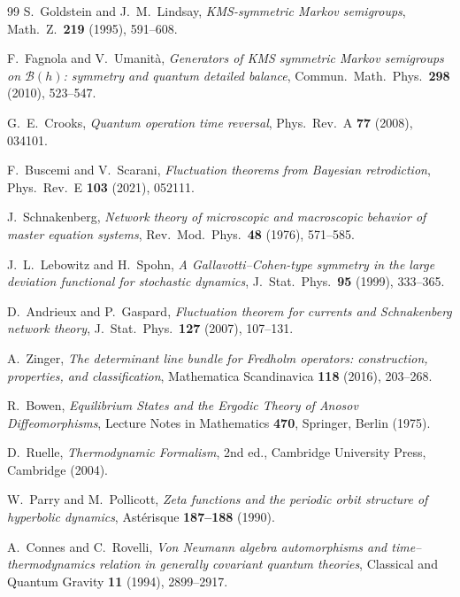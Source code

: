 \documentclass[11pt]{article}
\theoremstyle{definition}
\theoremstyle{remark}
\begin{document}
\begin{thebibliography}{99}
S.~Goldstein and J.~M.~Lindsay,
\emph{KMS-symmetric Markov semigroups},
Math.\ Z.\ \textbf{219} (1995), 591--608.

F.~Fagnola and V.~Umanit\`a,
\emph{Generators of KMS symmetric Markov semigroups on $\mathcal B(h)$:
symmetry and quantum detailed balance},
Commun.\ Math.\ Phys.\ \textbf{298} (2010), 523--547.

G.~E.~Crooks,
\emph{Quantum operation time reversal},
Phys.\ Rev.\ A \textbf{77} (2008), 034101.

F.~Buscemi and V.~Scarani,
\emph{Fluctuation theorems from Bayesian retrodiction},
Phys.\ Rev.\ E \textbf{103} (2021), 052111.


J.~Schnakenberg,
\emph{Network theory of microscopic and macroscopic behavior of master
equation systems},
Rev.\ Mod.\ Phys.\ \textbf{48} (1976), 571--585.

J.~L.~Lebowitz and H.~Spohn,
\emph{A Gallavotti--Cohen-type symmetry in the large deviation functional
for stochastic dynamics},
J.~Stat.\ Phys.\ \textbf{95} (1999), 333--365.

D.~Andrieux and P.~Gaspard,
\emph{Fluctuation theorem for currents and Schnakenberg network theory},
J.~Stat.\ Phys.\ \textbf{127} (2007), 107--131.

A.~Zinger,
\emph{The determinant line bundle for Fredholm operators: construction,
properties, and classification},
Mathematica Scandinavica \textbf{118} (2016), 203--268.

R.~Bowen,
\emph{Equilibrium States and the Ergodic Theory of Anosov Diffeomorphisms},
Lecture Notes in Mathematics \textbf{470}, Springer, Berlin (1975).


D.~Ruelle,
\emph{Thermodynamic Formalism}, 2nd ed.,
Cambridge University Press, Cambridge (2004).

W.~Parry and M.~Pollicott,
\emph{Zeta functions and the periodic orbit structure of hyperbolic
dynamics},
Ast\'erisque \textbf{187--188} (1990).

A.~Connes and C.~Rovelli,
\emph{Von Neumann algebra automorphisms and time--thermodynamics relation in
generally covariant quantum theories},
Classical and Quantum Gravity \textbf{11} (1994), 2899--2917.


\end{thebibliography}
\end{document}
